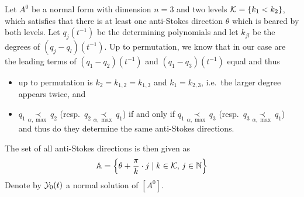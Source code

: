 Let $A^0$ be a normal form with dimension $n=3$ and two levels
$\mathcal{K}=\{k_1<k_2\}$, which satisfies that there is at least one anti-Stokes
direction $\theta$ which is beared by both levels.
Let $q_j(t^{-1})$ be the determining polynomials and let $k_{jl}$ be the
degrees of $(q_j-q_l)(t^{-1})$.
Up to permutation, we know that in our case are the leading terms of
$(q_1-q_2)(t^{-1})$ and $(q_1-q_3)(t^{-1})$ equal and thus
\begin{itemize}
  \item up to permutation is $k_2=k_{1,2}=k_{1,3}$ and $k_1=k_{2,3}$, i.e.\ the
    larger degree appears twice, and
    \begin{comment}
      let $q_1,q_2,q_3$ be polynomials, such that
      \[
        \deg(q_1-q_2) =: k_2 > k_1 := \deg(q_2-q_3)
      \]
      then is the degree of $q_1-q_3$ given by
      \begin{itemize}
        \item[\textbf{case 1}] $\deg(q_1)<k_2$: then is $\deg(q_2)=k_2$ and
          thus $\deg(q_3)=k_2$.
        \item[\textbf{case 2}] $\deg(q_2)<k_2$: then is $\deg(q_1)=k_2$ and
          $\deg(q_3)\leq\deg(q_2)$.
        \item[\textbf{case 3}] $\deg(q_1)=\deg(q_2)=k_2$: thus follows that the
          leading term of $q_1$ and $q_2$ are different.
          \begin{itemize}
            \item[\textbf{subcase 3.a}] $\deg(q_3)<k_2$: everything is clear
            \item[\textbf{subcase 3.b}] $\deg(q_3)=k_2$: here has the leading
              term of $q_3$ be equal to them from $q_1$ to satisfy that
              $k_2>\deg(q_2-q_3)$.
          \end{itemize}
      \end{itemize}
      From this follows that $\deg(q_1-q_3)=k_2$.
    \end{comment}
  \item $q_1 \underset{\alpha,\max}{\prec} q_2$
    (resp.~$q_2 \underset{\alpha,\max}{\prec} q_1$)
    if and only if
    $q_1 \underset{\alpha,\max}{\prec} q_3$
    (resp.~$q_3 \underset{\alpha,\max}{\prec} q_1$)
    and thus do they determine the same anti-Stokes directions.
\end{itemize}
The set of all anti-Stokes directions is then given as
\[
  \mathbb{A}=\left\{\theta+\frac{\pi}{k}\cdot j\mid k\in\mathcal{K}\text{, }j\in\mathbb{N}\right\}
\]
Denote by $\mathcal{Y}_0(t)$ a normal solution of $[A^0]$.

